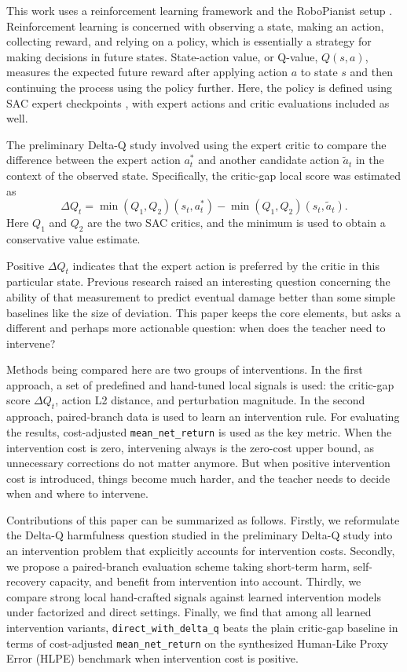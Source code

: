 \documentclass[11pt]{article}
\begin{document}
This work uses a reinforcement learning framework and the RoboPianist setup \cite{zakka2023robopianist}. Reinforcement learning is concerned with observing a state, making an action, collecting reward, and relying on a policy, which is essentially a strategy for making decisions in future states. State-action value, or Q-value, \(Q(s, a)\), measures the expected future reward after applying action \(a\) to state \(s\) and then continuing the process using the policy further. Here, the policy is defined using SAC expert checkpoints \cite{haarnoja2018sac}, with expert actions and critic evaluations included as well.

The preliminary Delta-Q study involved using the expert critic to compare the difference between the expert action \(a_t^\ast\) and another candidate action \(\tilde{a}_t\) in the context of the observed state. Specifically, the critic-gap local score was estimated as
\[
\Delta Q_t = \min(Q_1, Q_2)(s_t, a_t^\ast) - \min(Q_1, Q_2)(s_t, \tilde{a}_t).
\]
Here \(Q_1\) and \(Q_2\) are the two SAC critics, and the minimum is used to obtain a conservative value estimate.

Positive \(\Delta Q_t\) indicates that the expert action is preferred by the critic in this particular state. Previous research raised an interesting question concerning the ability of that measurement to predict eventual damage better than some simple baselines like the size of deviation. This paper keeps the core elements, but asks a different and perhaps more actionable question: when does the teacher need to intervene?

Methods being compared here are two groups of interventions. In the first approach, a set of predefined and hand-tuned local signals is used: the critic-gap score \(\Delta Q_t\), action L2 distance, and perturbation magnitude. In the second approach, paired-branch data is used to learn an intervention rule. For evaluating the results, cost-adjusted \texttt{mean\_net\_return} is used as the key metric. When the intervention cost is zero, intervening always is the zero-cost upper bound, as unnecessary corrections do not matter anymore. But when positive intervention cost is introduced, things become much harder, and the teacher needs to decide when and where to intervene.

Contributions of this paper can be summarized as follows. Firstly, we reformulate the Delta-Q harmfulness question studied in the preliminary Delta-Q study into an intervention problem that explicitly accounts for intervention costs. Secondly, we propose a paired-branch evaluation scheme taking short-term harm, self-recovery capacity, and benefit from intervention into account. Thirdly, we compare strong local hand-crafted signals against learned intervention models under factorized and direct settings. Finally, we find that among all learned intervention variants, \texttt{direct\_with\_delta\_q} beats the plain critic-gap baseline in terms of cost-adjusted \texttt{mean\_net\_return} on the synthesized Human-Like Proxy Error (HLPE) benchmark when intervention cost is positive.
\end{document}
